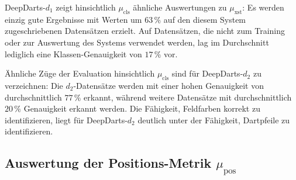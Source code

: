 DeepDarts-$d_1$ zeigt hinsichtlich $\mu_\text{cls}$ ähnliche Auswertungen zu $\mu_\text{xst}$: Es werden einzig gute Ergebnisse mit Werten um $63\,\%$ auf den diesem System zugeschriebenen Datensätzen erzielt. Auf Datensätzen, die nicht zum Training oder zur Auswertung des Systems verwendet werden, lag im Durchschnitt lediglich eine Klassen-Genauigkeit von $17\,\%$ vor.

Ähnliche Züge der Evaluation hinsichtlich $\mu_\text{cls}$ sind für DeepDarts-$d_2$ zu verzeichnen: Die $d_2$-Datensätze werden mit einer hohen Genauigkeit von durchschnittlich $77\,\%$ erkannt, während weitere Datensätze mit durchschnittlich $20\,\%$ Genauigkeit erkannt werden. Die Fähigkeit, Feldfarben korrekt zu identifizieren, liegt für DeepDarts-$d_2$ deutlich unter der Fähigkeit, Dartpfeile zu identifizieren.


\vspace*{3em}
\subsection{Auswertung der Positions-Metrik \texorpdfstring{$\mu_\text{pos}$}{µ\_pos}}
\label{sec:auswertung_pos}

\NNPos

